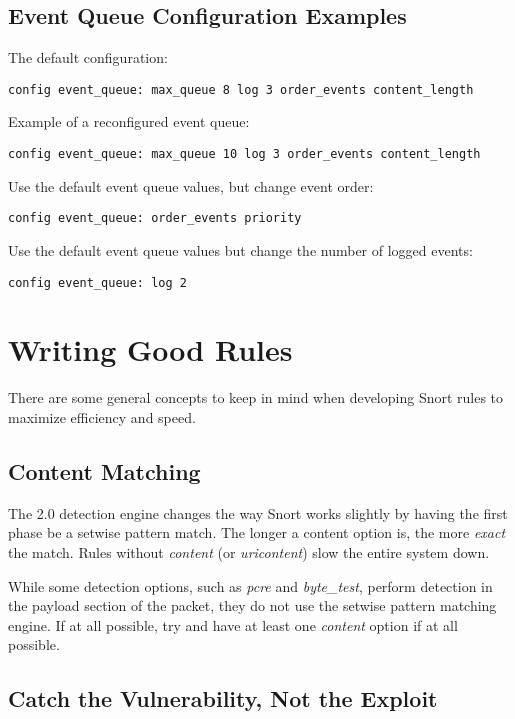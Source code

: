 \documentclass[english]{report}
\begin{document}
\subsection{Event Queue Configuration Examples}

The default configuration:
\begin{verbatim}
config event_queue: max_queue 8 log 3 order_events content_length
\end{verbatim}

Example of a reconfigured event queue:
\begin{verbatim}
config event_queue: max_queue 10 log 3 order_events content_length
\end{verbatim}

Use the default event queue values, but change event order:
\begin{verbatim}
config event_queue: order_events priority
\end{verbatim}

Use the default event queue values but change the number of logged events:
\begin{verbatim}
config event_queue: log 2
\end{verbatim}




\newpage
\section{Writing Good Rules}

There are some general concepts to keep in mind when developing Snort
rules to maximize efficiency and speed.

\subsection{Content Matching}
The 2.0 detection engine changes the way Snort works slightly by having the
first phase be a setwise pattern match.  The longer a content option is, the
more \emph{exact} the match.  Rules without \emph{content} (or
\emph{uricontent}) slow the entire system down.

While some detection options, such as \emph{pcre} and \emph{byte\_test},
perform detection in the payload section of the packet, they do not use the
setwise pattern matching engine.  If at all possible, try and have at least one
\emph{content} option if at all possible.

\subsection{Catch the Vulnerability, Not the Exploit}
\end{document}
